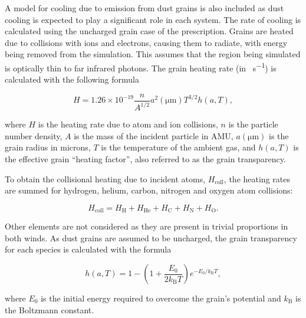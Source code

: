 \documentclass[fleqn,usenatbib]{mnras}
\begin{document}
A model for cooling due to emission from dust grains is also included as dust cooling is expected to play a significant role in each system.
The rate of cooling is calculated using the uncharged grain case of the \cite{dwek_infrared_1981} prescription.
Grains are heated due to collisions with ions and electrons, causing them to radiate, with energy being removed from the simulation.
This assumes that the region being simulated is optically thin to far infrared photons.
The grain heating rate (in \si{\erg\per\second}) is calculated with the following formula

\begin{equation}
    H = 1.26 \times 10^{-19} \frac{n}{A^{1/2}} a^2(\si{\micro\metre}) T^{3/2} h(a,T) , 
\end{equation}

\noindent
where $H$ is the heating rate due to atom and ion collisions, 
$n$ is the particle number density,
$A$ is the mass of the incident particle in AMU,
$a(\si{\micro\metre})$ is the grain radius in microns,
$T$ is the temperature of the ambient gas,
and $h(a,T)$ is the effective grain ``heating factor'', also referred to as the grain transparency. 

To obtain the collisional heating due to incident atoms, $H_\text{coll}$, the heating rates are summed for hydrogen, helium, carbon, nitrogen and oxygen atom collisions:

\begin{equation}
  H_\text{coll} = H_\text{H} + H_\text{He} + H_\text{C} + H_\text{N} + H_\text{O} .
\end{equation}

\noindent
Other elements are not considered as they are present in trivial proportions in both winds.
As dust grains are assumed to be uncharged, the grain transparency for each species is calculated with the formula

\begin{equation}
  h(a,T) = 1 - \left( 1 + \frac{E_0}{2 k_\text{B} T} \right) e^{- E_0 / k_\text{B} T} ,
\end{equation}

\noindent
where $E_0$ is the initial energy required to overcome the grain's potential and $k_\text{B}$ is the Boltzmann constant.
\end{document}
